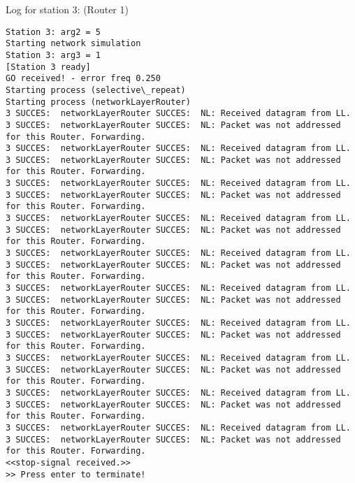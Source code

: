 Log for station 3: (Router 1)
\begin{lstlisting}[breaklines=true]
Station 3: arg2 = 5
Starting network simulation
Station 3: arg3 = 1
[Station 3 ready]
GO received! - error freq 0.250
Starting process (selective\_repeat)
Starting process (networkLayerRouter)
3 SUCCES:  networkLayerRouter SUCCES:  NL: Received datagram from LL.
3 SUCCES:  networkLayerRouter SUCCES:  NL: Packet was not addressed for this Router. Forwarding.
3 SUCCES:  networkLayerRouter SUCCES:  NL: Received datagram from LL.
3 SUCCES:  networkLayerRouter SUCCES:  NL: Packet was not addressed for this Router. Forwarding.
3 SUCCES:  networkLayerRouter SUCCES:  NL: Received datagram from LL.
3 SUCCES:  networkLayerRouter SUCCES:  NL: Packet was not addressed for this Router. Forwarding.
3 SUCCES:  networkLayerRouter SUCCES:  NL: Received datagram from LL.
3 SUCCES:  networkLayerRouter SUCCES:  NL: Packet was not addressed for this Router. Forwarding.
3 SUCCES:  networkLayerRouter SUCCES:  NL: Received datagram from LL.
3 SUCCES:  networkLayerRouter SUCCES:  NL: Packet was not addressed for this Router. Forwarding.
3 SUCCES:  networkLayerRouter SUCCES:  NL: Received datagram from LL.
3 SUCCES:  networkLayerRouter SUCCES:  NL: Packet was not addressed for this Router. Forwarding.
3 SUCCES:  networkLayerRouter SUCCES:  NL: Received datagram from LL.
3 SUCCES:  networkLayerRouter SUCCES:  NL: Packet was not addressed for this Router. Forwarding.
3 SUCCES:  networkLayerRouter SUCCES:  NL: Received datagram from LL.
3 SUCCES:  networkLayerRouter SUCCES:  NL: Packet was not addressed for this Router. Forwarding.
3 SUCCES:  networkLayerRouter SUCCES:  NL: Received datagram from LL.
3 SUCCES:  networkLayerRouter SUCCES:  NL: Packet was not addressed for this Router. Forwarding.
3 SUCCES:  networkLayerRouter SUCCES:  NL: Received datagram from LL.
3 SUCCES:  networkLayerRouter SUCCES:  NL: Packet was not addressed for this Router. Forwarding.
<<stop-signal received.>>
>> Press enter to terminate!
\end{lstlisting}

